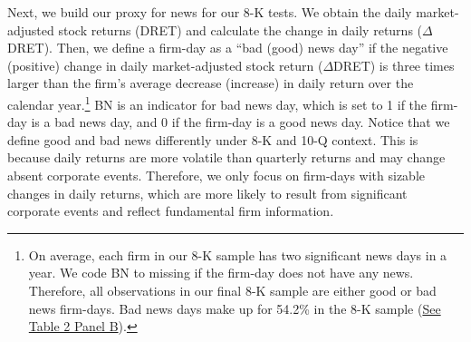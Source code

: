 \documentclass[letterpaper,11pt]{article}
\begin{document}
\begin{spacing}{1.5}
Next, we build our proxy for news for our 8-K tests. We obtain the daily market-adjusted stock returns (DRET) and calculate the change in daily returns ($\Delta$DRET). Then, we define a firm-day as a ``bad (good) news day” if the negative (positive) change in daily market-adjusted stock return ($\Delta$DRET) is three times larger than the firm's average decrease (increase) in daily return over the calendar year.\footnote{On average, each firm in our 8-K sample has two significant news days in a year. We code BN to missing if the firm-day does not have any news. Therefore, all observations in our final 8-K sample are either good or bad news firm-days. Bad news days make up for 54.2\% in the 8-K sample (\hyperref[T2PB]{See Table 2 Panel B}).} BN is an indicator for bad news day, which is set to 1 if the firm-day is a bad news day, and 0 if the firm-day is a good news day. Notice that we define good and bad news differently under 8-K and 10-Q context. This is because daily returns are more volatile than quarterly returns and may change absent corporate events. Therefore, we only focus on firm-days with sizable changes in daily returns, which are more likely to result from significant corporate events and reflect fundamental firm information.


\end{spacing}
\end{document}
